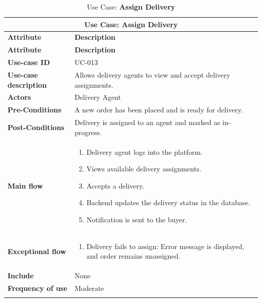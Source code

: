 \documentclass[12pt]{report}
\begin{document}
\begin{appendices}
	\begin{longtable}[H]{|l|p{9cm}||}
		\hline
		\multicolumn{2}{|c||}{\textbf{Use Case: Assign Delivery}}                                                                \\
		\hline
		\textbf{Attribute}            & \textbf{Description}                                                                     \\
		\hline
		\endfirsthead
		\hline
		\textbf{Attribute}            & \textbf{Description}                                                                     \\
		\hline
		\endhead
		\textbf{Use-case ID}          & UC-013                                                                                   \\
		\hline
		\textbf{Use-case description} & Allows delivery agents to view and accept delivery assignments.                          \\
		\hline
		\textbf{Actors}               & Delivery Agent                                                                           \\
		\hline
		\textbf{Pre-Conditions}       & A new order has been placed and is ready for delivery.                                   \\
		\hline
		\textbf{Post-Conditions}      & Delivery is assigned to an agent and marked as in-progress.                              \\
		\hline
		\textbf{Main flow}            & \begin{enumerate}
			                                \item Delivery agent logs into the platform.
			                                \item Views available delivery assignments.
			                                \item Accepts a delivery.
			                                \item Backend updates the delivery status in the database.
			                                \item Notification is sent to the buyer.
		                                \end{enumerate}                                \\
		\hline
		\textbf{Exceptional flow}     & \begin{enumerate}
			                                \item Delivery fails to assign: Error message is displayed, and order remains unassigned.
		                                \end{enumerate} \\
		\hline
		\textbf{Include}              & None                                                                                     \\
		\hline
		\textbf{Frequency of use}     & Moderate                                                                                 \\
		\hline
		\hline
		\caption{Use Case: \textbf{Assign Delivery}}\label{tab:tableAssignDelivery}
	\end{longtable}


\end{appendices}
\end{document}
